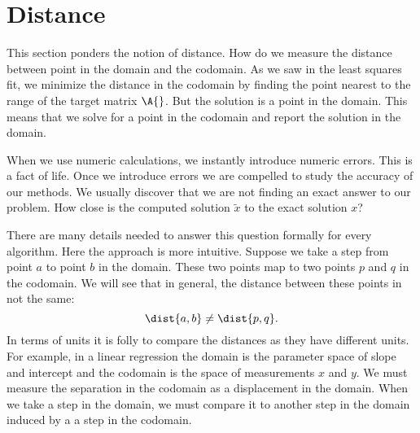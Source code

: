 \section{Distance}
This section ponders the notion of distance. How do we measure the distance between point in the domain and the codomain. As we saw in the least squares fit, we minimize the distance in the codomain by finding the point nearest to the range of the target matrix $\A{}$. But the solution is a point in the domain. This means that we solve for a point in the codomain and report the solution in the domain.

When we use numeric calculations, we instantly introduce numeric errors. This is a fact of life. Once we introduce errors we are compelled to study the accuracy of our methods. We usually discover that we are not finding an exact answer to our problem. How close is the computed solution $\tilde{x}$ to the exact solution $x$? %

There are many details needed to answer this question formally for every algorithm. Here the approach is more intuitive. Suppose we take a step from point $a$ to point $b$ in the domain. These two points map to two points $p$ and $q$ in the codomain. We will see that in general, the distance between these points in not the same:
\begin{equation}
  \dist{a,b} \ne \dist{p,q}.
\end{equation}
In terms of units it is folly to compare the distances as they have different units. For example, in a linear regression the domain is the parameter space of slope and intercept and the codomain is the space of measurements $x$ and $y$. We must measure the separation in the codomain as a displacement in the domain. When we take a step in the domain, we must compare it to another step in the domain induced by a a step in the codomain.

